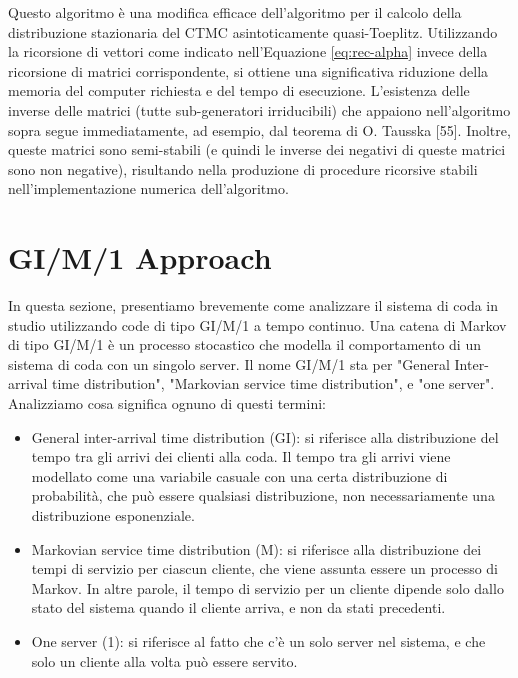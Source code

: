 \documentclass[11pt]{article}
\newtheorem{corollario}[teorema]{Corollario}
\begin{document}
Questo algoritmo è una modifica efficace dell'algoritmo per il calcolo della distribuzione stazionaria del CTMC asintoticamente quasi-Toeplitz. Utilizzando la ricorsione di vettori come indicato nell'Equazione \ref{eq:rec-alpha} invece della ricorsione di matrici corrispondente, si ottiene una significativa riduzione della memoria del computer richiesta e del tempo di esecuzione. L'esistenza delle inverse delle matrici (tutte sub-generatori irriducibili) che appaiono nell'algoritmo sopra segue immediatamente, ad esempio, dal teorema di O. Tausska [55]. Inoltre, queste matrici sono semi-stabili (e quindi le inverse dei negativi di queste matrici sono non negative), risultando nella produzione di procedure ricorsive stabili nell'implementazione numerica dell'algoritmo.


\clearpage

\section{GI/M/1 Approach}

In questa sezione, presentiamo brevemente come analizzare il sistema di coda in studio utilizzando code di tipo GI/M/1 a tempo continuo. Una catena di Markov di tipo GI/M/1 è un processo stocastico che modella il comportamento di un sistema di coda con un singolo server. Il nome GI/M/1 sta per "General Inter-arrival time distribution", "Markovian service time distribution", e "one server". Analizziamo cosa significa ognuno di questi termini:

\begin{itemize}
    \item General inter-arrival time distribution (GI): si riferisce alla distribuzione del tempo tra gli arrivi dei clienti alla coda. Il tempo tra gli arrivi viene modellato come una variabile casuale con una certa distribuzione di probabilità, che può essere qualsiasi distribuzione, non necessariamente una distribuzione esponenziale.

    \item Markovian service time distribution (M): si riferisce alla distribuzione dei tempi di servizio per ciascun cliente, che viene assunta essere un processo di Markov. In altre parole, il tempo di servizio per un cliente dipende solo dallo stato del sistema quando il cliente arriva, e non da stati precedenti.

    \item One server (1): si riferisce al fatto che c'è un solo server nel sistema, e che solo un cliente alla volta può essere servito.
\end{itemize}
\end{document}
